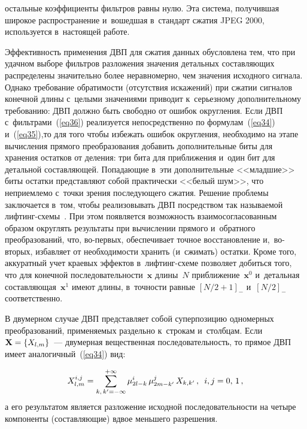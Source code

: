 \begin{multicols}{2}

\noindent
остальные коэффициенты фильтров равны нулю. Эта система, получившая широкое 
распространение и~вошедшая в~стандарт сжатия JPEG 2000, используется в~настоящей 
работе.

Эффективность применения ДВП для сжатия данных обусловлена тем, что 
при удачном выборе фильтров разложения значения детальных со\-став\-ля\-ющих 
распределены значительно более неравномерно, чем значения исходного сигнала. 
Однако требование обратимости (отсутствия искажений) при сжатии сигналов 
конечной длины с~целыми значениями приводит к~серьезному дополнительному 
требованию: ДВП должно быть свободно от ошибок округления. Если 
ДВП с~фильтрами~(\ref{eq36}) реализуется непосредственно по 
формулам~(\ref{eq34}) и~(\ref{eq35}),\linebreak то для того чтобы избежать 
ошибок округления, необходи\-мо на этапе вычисления прямого преобразования 
добавить дополнительные биты для хранения остатков от деления: три бита 
для приближения и~один бит для детальной составляющей. По\-па\-да\-ющие в~эти 
дополнительные <<младшие>>\linebreak
 биты остатки представляют собой практически 
<<белый шум>>, что неприемлемо с~точки зрения последующего сжатия. 
Решение проб\-ле\-мы заключается в~том, чтобы реализовывать ДВП посредством 
так называемой лиф\-тинг-схе\-мы~\cite{b08}. При этом появляется возможность 
взаимосогласованным образом округлять результаты при вычислении прямого и~обратного 
преобразований, что, во-пер\-вых, обеспечивает точное восстановление 
и,~во-вто\-рых, избавляет от необходимости хранить (и~сжимать) остатки. 
Кроме того, аккуратный учет краевых эффектов в~лиф\-тинг-схе\-ме позволяет 
добиться того, что для конечной последовательности~$\mathbf{ x}$ длины~$N$ 
приближение~$\mathbf{ x}^0$ и~детальная составляющая~$\mathbf{x}^1$ имеют 
длины, в~точ\-ности равные $[N/2+1]_-$ и~$[N/2]_-$ соответственно.

В двумерном случае ДВП представляет собой суперпозицию одномерных преобразований, 
применяемых раздельно к~строкам и~столбцам. Если $\mathbf{X}\hm=\{X_{l,m}\}$~--- 
двумерная вещественная последовательность, то прямое ДВП имеет 
аналогичный~(\ref{eq34}) вид:

\noindent
$$
X_{l,m}^{i,j}=\sum\limits_{k,\,k'=-\infty}^{+\infty}
\mu_{2l-k}^{i}\,\mu_{2m-k'}^{j}\,X_{k,k'}\,,
\enskip i,j=0,\,1\,,
$$
а его результатом является разложение исходной последовательности 
на четыре компоненты (со\-став\-ля\-ющие) вдвое меньшего разрешения.


\end{multicols}
